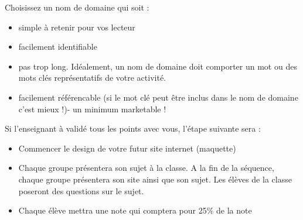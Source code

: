 \documentclass[12pt,a4paper]{article} %
\begin{document}
\begin{enumerate}
\vspace{0.5cm}
 Choisissez un nom de domaine qui soit :

\begin{itemize}
\item simple à retenir pour vos lecteur
\item  facilement identifiable
\item pas trop long. Idéalement, un nom de domaine doit comporter un mot ou des mots clés représentatifs de votre activité.
\item facilement référencable (si le mot clé peut être inclus dans le nom de domaine c'est mieux !)- un minimum marketable !
\end{itemize}




\end{enumerate}

Si l'enseignant à validé tous les points avec vous, l'étape suivante sera :\\
\begin{itemize}
\item Commencer le design de votre futur site internet (maquette)

\item Chaque groupe présentera son sujet à la classe. A la fin de la séquence, chaque groupe présentera son site ainsi que son sujet. Les élèves de la classe poseront des questions sur le sujet. 

\item Chaque élève mettra une note qui comptera pour 25$\%$ de la note
\end{itemize}








\end{document}
